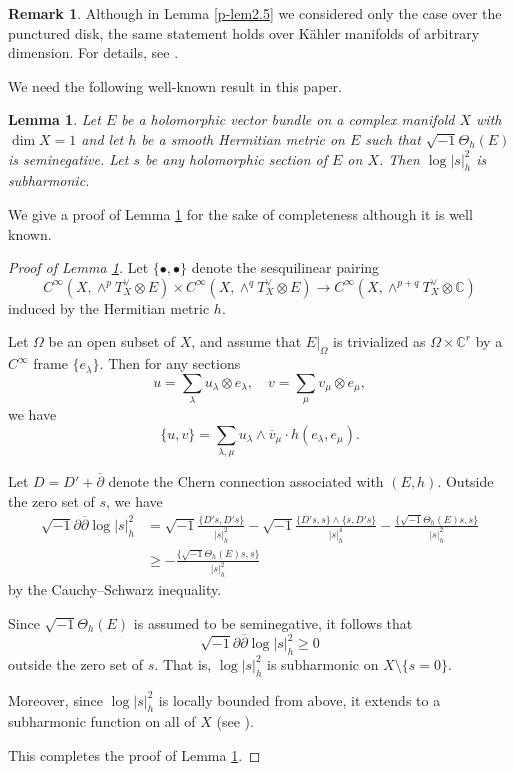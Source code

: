 \documentclass[12pt,twoside]{amsart}
\newtheorem{lem}[thm]{Lemma}
\theoremstyle{definition}
\newtheorem{rem}[thm]{Remark}
\begin{document}
\begin{rem}\label{p-rem2.6}
Although in Lemma \ref{p-lem2.5} 
we considered only the case over the punctured disk, 
the same statement holds over K\"ahler manifolds of arbitrary dimension.
For details, see \cite[Lemma 2.10]{deng-hao}.
\end{rem}

We need the following well-known result in this paper. 

\begin{lem}\label{p-lem2.7}
Let $E$ be a holomorphic vector bundle on a complex manifold $X$ with 
$\dim X=1$ and let $h$ be a smooth Hermitian metric on $E$ such that 
$\sqrt{-1} \Theta_h(E)$ is seminegative. 
Let $s$ be any holomorphic section of $E$ on $X$. 
Then $\log |s|^2_h$ is subharmonic. 
\end{lem}
We give a proof of Lemma \ref{p-lem2.7} for the sake of completeness although 
it is well known. 

\begin{proof}[Proof of Lemma \ref{p-lem2.7}]

Let $\{\bullet, \bullet\}$ denote the sesquilinear pairing
\[
C^\infty(X, \wedge^p T^\vee_X \otimes E) \times 
C^\infty(X, \wedge^q T^\vee_X \otimes E) \to 
C^\infty(X, \wedge^{p+q} T^\vee_X \otimes \mathbb{C})
\]
induced by the Hermitian metric $h$.

Let $\Omega$ be an open subset of $X$, 
and assume that $E|_\Omega$ is trivialized 
as $\Omega\times \mathbb C^r$ by a $C^\infty$ frame $\{e_\lambda\}$. 
Then for any sections
\[
u = \sum_\lambda u_\lambda \otimes e_\lambda,
\quad 
v = \sum_\mu v_\mu \otimes e_\mu,
\]
we have
\[
\{u, v\} = \sum_{\lambda, \mu} u_\lambda \wedge 
\overline v_\mu \cdot h(e_\lambda, e_\mu).
\]

Let $D = D' + \overline{\partial}$ denote the Chern 
connection associated with $(E, h)$. 
Outside the zero set of $s$, we have
\[
\begin{split}
\sqrt{-1} \partial \overline{\partial} \log |s|^2_h 
&= \sqrt{-1} \frac{\{D' s, D' s\}}{|s|^2_h} 
  - \sqrt{-1} \frac{\{D' s, s\} \wedge \{s, D' s\}}{|s|^4_h} 
  - \frac{\{\sqrt{-1} \Theta_h(E) s, s\}}{|s|^2_h} \\
&\geq - \frac{\{\sqrt{-1} \Theta_h(E) s, s\}}{|s|^2_h}
\end{split}
\]
by the Cauchy--Schwarz inequality. 

Since $\sqrt{-1} \Theta_h(E)$ is assumed 
to be seminegative, it follows that
\[
\sqrt{-1} \partial \overline{\partial} \log |s|^2_h \geq 0
\]
outside the zero set of $s$. That is, 
$\log |s|^2_h$ is subharmonic on $X \setminus \{s = 0\}$. 

Moreover, since $\log |s|^2_h$ is 
locally bounded from above, it extends to a subharmonic function on all of $X$ (see \cite[(3.3.25) Theorem]{noguchi-ochiai}). 

This completes the proof of Lemma \ref{p-lem2.7}.
\end{proof}
\end{document}

